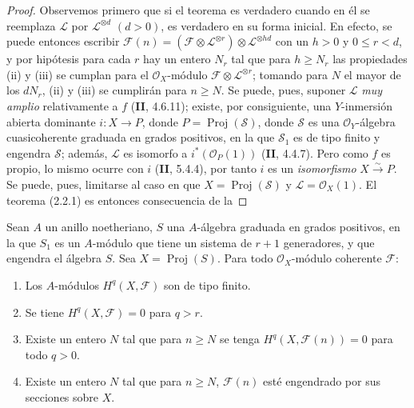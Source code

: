 \begin{proof}
Observemos primero que si el teorema es verdadero cuando en él se reemplaza $\mathcal L$ por $\mathcal L^{\otimes d}$ $(d>0)$, es verdadero en su forma inicial. En efecto, se puede entonces escribir $\mathcal F(n)
=(\mathcal F\otimes\mathcal L^{\otimes r})
\otimes\mathcal L^{\otimes hd}$ con un $h>0$ y $0\leq r<d$, y por hipótesis para cada $r$ hay un entero $N_r$ tal que para $h\geq N_r$ las propiedades (ii) y (iii) se cumplan para el $\mathcal O_X$-módulo $\mathcal F\otimes\mathcal L^{\otimes r}$; tomando para $N$ el mayor de los $dN_r$, (ii) y (iii) se cumplirán para $n\geq N$. Se puede, pues, suponer $\mathcal L$ \emph{muy amplio} relativamente a $f$ (\textbf{II}, 4.6.11); existe, por consiguiente, una $Y$-inmersión abierta dominante $i:X\to P$, donde $P=\operatorname{Proj}(\mathcal S)$, donde $\mathcal S$ es una $\mathcal O_Y$-álgebra cuasicoherente graduada en grados positivos, en la que $\mathcal S_1$ es de tipo finito y engendra $\mathcal S$; además, $\mathcal L$ es isomorfo a $i^*(\mathcal O_P(1))$ (\textbf{II}, 4.4.7). Pero como $f$ es propio, lo mismo ocurre con $i$ (\textbf{II}, 5.4.4), por tanto $i$ es un \emph{isomorfismo} $X\xrightarrow{\sim}P$. Se puede, pues, limitarse al caso en que $X=\operatorname{Proj}(\mathcal S)$ y $\mathcal L=\mathcal O_X(1)$. El teorema (2.2.1) es entonces consecuencia de la
\end{proof}

\begin{proposition}[2.2.2]
\label{III.2.2.2-fr}
Sean $A$ un anillo noetheriano, $S$ una $A$-álgebra graduada en grados positivos, en la que $S_1$ es un $A$-módulo que tiene un sistema de $r+1$ generadores, y que engendra el álgebra $S$. Sea $X=\operatorname{Proj}(S)$. Para todo $\mathcal O_X$-módulo coherente $\mathcal F$:
\begin{enumerate}
\item[{\rm(i)}] Los $A$-módulos $H^q(X,\mathcal F)$ son de tipo finito.
\item[{\rm(ii)}] Se tiene $H^q(X,\mathcal F)=0$ para $q>r$.
\item[{\rm(iii)}] Existe un entero $N$ tal que para $n\geq N$ se tenga $H^q(X,\mathcal F(n))=0$ para todo $q>0$.
\item[{\rm(iv)}] Existe un entero $N$ tal que para $n\geq N$, $\mathcal F(n)$ esté engendrado por sus secciones sobre $X$.
\end{enumerate}
\end{proposition}


